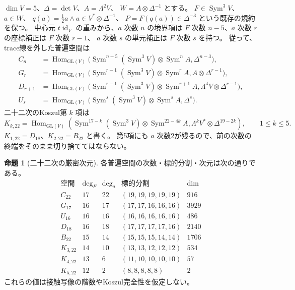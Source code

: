 \documentclass[a4paper,11pt]{ltjsarticle}
\theoremstyle{definition}
\newtheorem{proposition}[theorem]{命題}
\begin{document}
$\dim V=5$、$\Delta=\det V$、$A=\Lambda^2V$、
$W=A\otimes\Delta^{-1}$ とする。
$F\in\operatorname{Sym}^3V$、$a\in W$、
$q(a)=\tfrac12a\wedge a\in V^*\otimes\Delta^{-1}$、
$P=F(q(a))\in\Delta^{-3}$ という既存の規約を保つ。
中心元 $t\operatorname{id}_V$ の重みから、$a$ 次数 $n$ の境界項は
$F$ 次数 $n-5$、$a$ 次数 $r$ の座標補正は $F$ 次数 $r-1$、
$a$ 次数 $s$ の単元補正は $F$ 次数 $s$ を持つ。
従って、trace線を外した普遍空間は
\begin{align*}
 C_n&=\operatorname{Hom}_{\mathrm{GL}(V)}
 \bigl(\operatorname{Sym}^{n-5}(\operatorname{Sym}^3V)
       \otimes\operatorname{Sym}^{n}A,\Delta^{n-3}\bigr),\\
 G_r&=\operatorname{Hom}_{\mathrm{GL}(V)}
 \bigl(\operatorname{Sym}^{r-1}(\operatorname{Sym}^3V)
       \otimes\operatorname{Sym}^{r}A,A\otimes\Delta^{r-1}\bigr),\\
 D_{r+1}&=\operatorname{Hom}_{\mathrm{GL}(V)}
 \bigl(\operatorname{Sym}^{r-1}(\operatorname{Sym}^3V)
       \otimes\operatorname{Sym}^{r+1}A,\Lambda^4V\otimes\Delta^{r-1}\bigr),\\
 U_s&=\operatorname{Hom}_{\mathrm{GL}(V)}
 \bigl(\operatorname{Sym}^{s}(\operatorname{Sym}^3V)
       \otimes\operatorname{Sym}^{s}A,\Delta^s\bigr).
\end{align*}
二十二次のKoszul第 $k$ 項は
\[
 K_{k,22}=\operatorname{Hom}_{\mathrm{GL}(V)}
 \left(\operatorname{Sym}^{17-k}(\operatorname{Sym}^3V)
 \otimes\operatorname{Sym}^{22-4k}A,
 \Lambda^kV^*\otimes\Delta^{19-2k}\right),\qquad 1\leq k\leq5.
\]
$K_{1,22}=D_{18}$、$K_{2,22}=B_{22}$ と書く。
第5項にも $a$ 次数2が残るので、前の次数の終端をそのまま切り捨ててはならない。

\begin{proposition}[二十二次の厳密次元]
\label{prop:v16-character-dimensions}
各普遍空間の次数・標的分割・次元は次の通りである。
\[
\begin{array}{c|r|r|c|r}
\text{空間}&\deg_F&\deg_a&\text{標的分割}&\dim\\\hline
C_{22}&17&22&(19,19,19,19,19)&916\\
G_{17}&16&17&(17,17,16,16,16)&3929\\
U_{16}&16&16&(16,16,16,16,16)&486\\
D_{18}&16&18&(17,17,17,17,16)&2140\\
B_{22}&15&14&(15,15,15,14,14)&1706\\
K_{3,22}&14&10&(13,13,12,12,12)&534\\
K_{4,22}&13&6&(11,10,10,10,10)&57\\
K_{5,22}&12&2&(8,8,8,8,8)&2
\end{array}
\]
これらの値は接触写像の階数やKoszul完全性を仮定しない。
\end{proposition}
\end{document}
